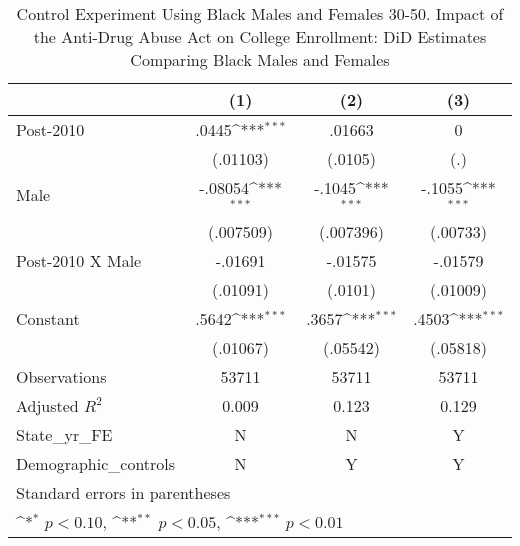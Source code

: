 \begin{table}[htbp]\centering
\def\sym#1{\ifmmode^{#1}\else\(^{#1}\)\fi}
\caption{Control Experiment Using Black Males and Females 30-50. Impact of the Anti-Drug Abuse Act on College Enrollment: DiD Estimates Comparing Black Males and Females}
\begin{tabular}{l*{3}{c}}
\hline\hline
                    &\multicolumn{1}{c}{(1)}         &\multicolumn{1}{c}{(2)}         &\multicolumn{1}{c}{(3)}         \\
\hline
Post-2010           &       .0445\sym{***}&      .01663         &           0         \\
                    &    (.01103)         &     (.0105)         &         (.)         \\
[1em]
Male                &     -.08054\sym{***}&      -.1045\sym{***}&      -.1055\sym{***}\\
                    &   (.007509)         &   (.007396)         &    (.00733)         \\
[1em]
Post-2010 X Male    &     -.01691         &     -.01575         &     -.01579         \\
                    &    (.01091)         &     (.0101)         &    (.01009)         \\
[1em]
Constant            &       .5642\sym{***}&       .3657\sym{***}&       .4503\sym{***}\\
                    &    (.01067)         &    (.05542)         &    (.05818)         \\
\hline
Observations        &       53711         &       53711         &       53711         \\
Adjusted \(R^{2}\)  &       0.009         &       0.123         &       0.129         \\
State\_yr\_FE         &           N         &           N         &           Y         \\
Demographic\_controls&           N         &           Y         &           Y         \\
\hline\hline
\multicolumn{4}{l}{\footnotesize Standard errors in parentheses}\\
\multicolumn{4}{l}{\footnotesize \sym{*} \(p<0.10\), \sym{**} \(p<0.05\), \sym{***} \(p<0.01\)}\\
\end{tabular}
\end{table}
